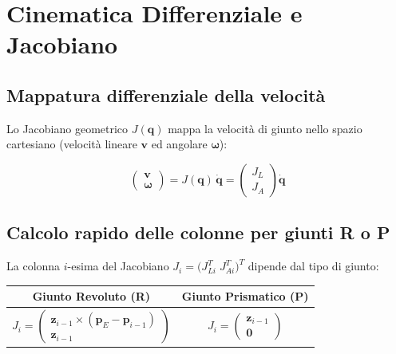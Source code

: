 \documentclass[11pt, a4paper]{article}
\begin{document}
\section{Cinematica Differenziale e Jacobiano}

\subsection{Mappatura differenziale della velocità}

Lo Jacobiano geometrico $J(\mathbf{q})$ mappa la velocità di giunto nello spazio cartesiano
(velocità lineare $\mathbf{v}$ ed angolare $\boldsymbol{\omega}$):
\begin{formulabox}
\[
\begin{pmatrix} \mathbf{v} \\ \boldsymbol{\omega} \end{pmatrix}
= J(\mathbf{q})\,\dot{\mathbf{q}}
= \begin{pmatrix} J_L \\ J_A \end{pmatrix} \dot{\mathbf{q}}
\]
\end{formulabox}

\subsection{Calcolo rapido delle colonne per giunti R o P}

La colonna $i$-esima del Jacobiano $J_i = \bigl(J_{Li}^T\; J_{Ai}^T\bigr)^T$ dipende
dal tipo di giunto:

\begin{center}
\begin{tabular}{cc}
\toprule
\textbf{Giunto Revoluto (R)} & \textbf{Giunto Prismatico (P)}\\
\midrule
$J_i = \begin{pmatrix} \mathbf{z}_{i-1} \times (\mathbf{p}_E - \mathbf{p}_{i-1}) \\ \mathbf{z}_{i-1} \end{pmatrix}$
&
$J_i = \begin{pmatrix} \mathbf{z}_{i-1} \\ \mathbf{0} \end{pmatrix}$\\
\bottomrule
\end{tabular}
\end{center}
\end{document}
